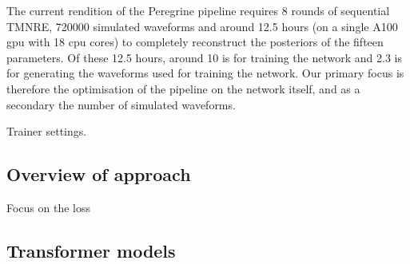 
The current rendition of the Peregrine pipeline requires 8 rounds of sequential TMNRE, 720000 simulated waveforms and around 12.5 hours (on a single A100 gpu with 18 cpu cores) to completely reconstruct the posteriors of the fifteen parameters. Of these 12.5 hours, around 10 is for training the network and 2.3 is for generating the waveforms used for training the network. Our primary focus is therefore the optimisation of the pipeline on the network itself, and as a secondary the number of simulated waveforms.

Trainer settings.

\subsection{Overview of approach}

Focus on the loss 

\subsection{Transformer models}



